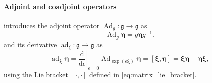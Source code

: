 



\paragraph{Adjoint and coadjoint operators}
\cite{Lee2008} introduces the adjoint operator $\operatorname{Ad}_g: \mathfrak{g} \to \mathfrak{g}$ as
\begin{equation}
    \operatorname{Ad}_{g}\bm{\eta}
    =
    g\bm{\eta}g^{-1}.
    \label{eq:adjoint_matrix}
\end{equation}
and its derivative  $\operatorname{ad}_\xi: \mathfrak{g} \to \mathfrak{g}$ as
\begin{equation}
    \operatorname{ad}_{\bm{\xi}}\bm{\eta}
    =
    \left.\frac{\mathrm{d}}{\mathrm{d}\epsilon}\right|_{\epsilon=0}
    \operatorname{Ad}_{\exp(\epsilon\bm{\xi})}\bm{\eta}
    =
    [\bm{\xi},\bm{\eta}]
    = \bm{\xi}\bm{\eta} - \bm{\eta}\bm{\xi},
    \label{eq:ad_lie_bracket}
\end{equation}
using the Lie bracket $[\cdot,\cdot]$ defined in \eqref{eq:matrix_lie_bracket}.

